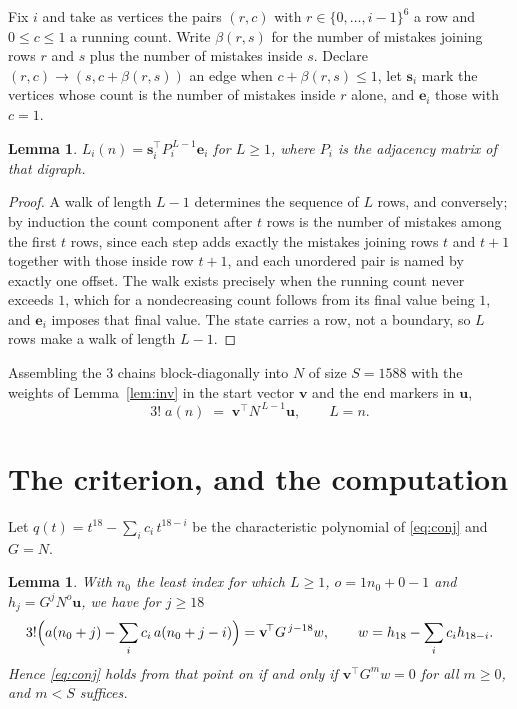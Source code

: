\documentclass[11pt,a4paper]{article}
\theoremstyle{plain}
\newtheorem{lemma}[theorem]{Lemma}
\theoremstyle{definition}
\begin{document}
Fix $i$ and take as vertices the pairs $(r,c)$ with $r\in\{0,\dots,i-1\}^{6}$ a row
and $0\le c\le1$ a running count. Write $\beta(r,s)$ for the number of mistakes joining
rows $r$ and $s$ plus the number of mistakes inside $s$. Declare $(r,c)\to(s,c+\beta(r,s))$
an edge when $c+\beta(r,s)\le1$, let $\mathbf{s}_i$ mark the vertices whose count is the
number of mistakes inside $r$ alone, and $\mathbf{e}_i$ those with $c=1$.

\begin{lemma}\label{lem:walk}
$L_i(n)=\mathbf{s}_i^{\!\top}P_i^{\,L-1}\mathbf{e}_i$ for $L\ge1$, where $P_i$ is the
adjacency matrix of that digraph.
\end{lemma}

\begin{proof}
A walk of length $L-1$ determines the sequence of $L$ rows, and conversely; by induction
the count component after $t$ rows is the number of mistakes among the first $t$ rows,
since each step adds exactly the mistakes joining rows $t$ and $t+1$ together with those
inside row $t+1$, and each unordered pair is named by exactly one offset. The walk exists
precisely when the running count never exceeds $1$, which for a nondecreasing count follows
from its final value being $1$, and $\mathbf{e}_i$ imposes that final value. The state
carries a row, not a boundary, so $L$ rows make a walk of length $L-1$.
\end{proof}

Assembling the $3$ chains block-diagonally into $N$ of size $S=1588$ with the weights of
Lemma~\ref{lem:inv} in the start vector $\mathbf{v}$ and the end markers in
$\mathbf{u}$,
\begin{equation}\label{eq:walk2}
3!\;a(n)\;=\;\mathbf{v}^{\!\top}N^{\,L-1}\mathbf{u},\qquad L=n .
\end{equation}

\section{The criterion, and the computation}

Let $q(t)=t^{18}-\sum_i c_i\,t^{18-i}$ be the characteristic polynomial of
\eqref{eq:conj} and $G=N$.

\begin{lemma}\label{lem:crit}
With $n_0$ the least index for which $L\ge1$, $o=1n_0+0-1$ and
$h_j=G^{j}N^{o}\mathbf{u}$, we have for $j\ge18$
\[
3!\Bigl(a(n_0+j)-\sum_i c_i\,a(n_0+j-i)\Bigr)=\mathbf{v}^{\!\top}G^{\,j-18}w,
\qquad w=h_{18}-\sum_i c_ih_{18-i} .
\]
Hence \eqref{eq:conj} holds from that point on if and only if
$\mathbf{v}^{\!\top}G^{m}w=0$ for all $m\ge0$, and $m<S$ suffices.
\end{lemma}
\end{document}
